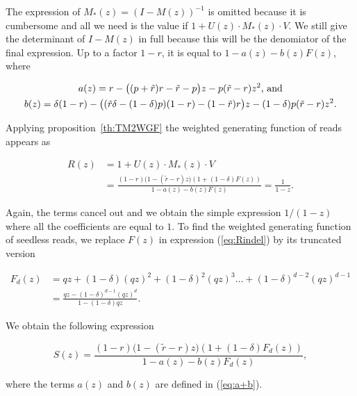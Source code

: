 \documentclass{article}
\begin{document}
The expression of $M_*(z) = (I-M(z))^{-1}$ is omitted because it is
cumbersome and all we need is the value if $1+U(z)\cdot M_*(z)\cdot V$.
We still give the determinant of $I-M(z)$ in full because this will be the
denomiator of the final expression. Up to a factor $1-r$, it is equal to
$1-a(z)-b(z)F(z)$, where

\begin{gather}
\label{eq:a+b}
a(z) = r-\big((p+\tilde{r})r-\tilde{r}-p\big)z
- p(\tilde{r}-r)z^2\text{, and} \\
b(z) = \delta(1-r) - \big((\tilde{r}\delta-(1-\delta)p)(1-r)
-(1-\tilde{r})r\big)z -(1-\delta)p(\tilde{r}-r)z^2.
\notag
\end{gather}

Applying proposition~\ref{th:TM2WGF} the weighted generating function of
reads appears as

\begin{equation}
\label{eq:Rindel}
\begin{split}
R(z) &= 1 + U(z) \cdot M_*(z) \cdot V \\
&= \frac{(1-r)\big( 1-(\tilde{r}-r)z \big)
\left(1+(1-\delta)F(z) \right)}{1-a(z)-b(z)F(z)}
= \frac{1}{1-z}.
\end{split}
\end{equation}

Again, the terms cancel out and we obtain the simple expression
$1/(1-z)$ where all the coefficients are equal to $1$. To find the
weighted generating function of seedless reads, we replace $F(z)$ in
expression (\ref{eq:Rindel}) by its truncated version

\begin{equation*}
\begin{split}
F_d(z) &= qz + (1-\delta)(qz)^2 + (1-\delta)^2(qz)^3 \ldots +
(1-\delta)^{d-2}(qz)^{d-1} \\
&= \frac{qz-(1-\delta)^{d-1}(qz)^d}{1-(1-\delta)qz}.
\end{split}
\end{equation*}

We obtain the following expression

\begin{equation}
\label{eq:Sindel}
S(z) = \frac{(1-r)\big( 1-(\tilde{r}-r)z \big) \left(1+(1-\delta)F_d(z)
\right)}{1-a(z)-b(z)F_d(z)},
\end{equation}

\noindent
where the terms $a(z)$ and $b(z)$ are defined in (\ref{eq:a+b}).
\end{document}

